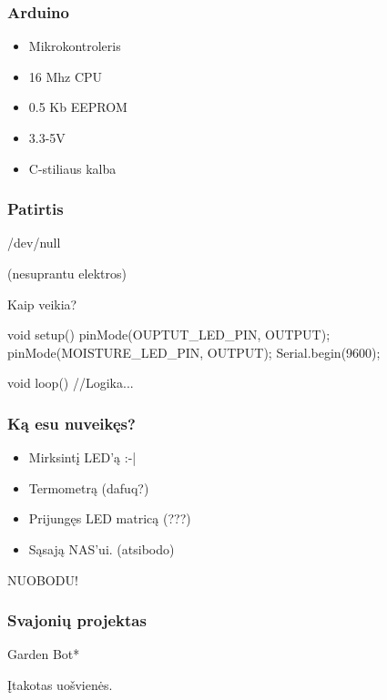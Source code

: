 \documentclass[12pt,a4paper]{beamer}
\begin{document}
\begin{frame}
    \frametitle{Arduino}

    \begin{itemize}
        \item Mikrokontroleris
        \item 16 Mhz CPU
        \item 0.5 Kb EEPROM
        \item 3.3-5V
        \item C-stiliaus kalba
    \end{itemize}
    
\end{frame}

\begin{frame}
    \frametitle{Patirtis}
	\begin{center}
        {\Huge /dev/null}
	\end{center}
    \begin{center}
        (nesuprantu elektros)
    \end{center}
\end{frame}


\begin{frame}[fragile]{Kaip veikia?}
\begin{ccode}
    void setup() {                
        pinMode(OUPTUT_LED_PIN, OUTPUT);
        pinMode(MOISTURE_LED_PIN, OUTPUT);
        Serial.begin(9600);
    }

    void loop() {
        //Logika...
    }
\end{ccode}
\end{frame}

\begin{frame}
    \frametitle{Ką esu nuveikęs?}

    \pause
    \begin{itemize}
        \item Mirksintį LED'ą :-|
        \pause
        \item Termometrą (dafuq?)
        \pause
        \item Prijungęs LED matricą (???)
        \pause
        \item Sąsają NAS'ui. (atsibodo)
    \end{itemize}
    \pause
    \begin{center}
        NUOBODU!
    \end{center}
\end{frame}

\begin{frame}
    \frametitle{Svajonių projektas}

    \begin{center}
        {\Huge Garden Bot*}
    \end{center}

    \vskip1cm
    {\small *Įtakotas uošvienės.}
    
\end{frame}
\end{document}
